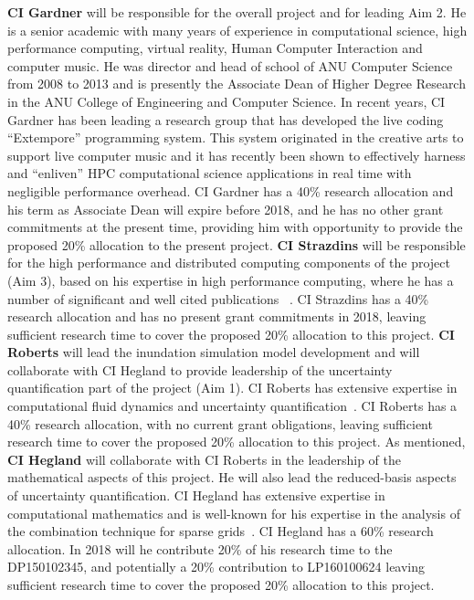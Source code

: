 {\bf CI Gardner} will be responsible for the overall project and for leading Aim 2. He is a senior
academic with many years of experience in computational science, high
performance computing, virtual reality, Human Computer Interaction and
computer music. He was director and head of school of ANU Computer
Science from 2008 to 2013 and is presently the Associate Dean of
Higher Degree Research in the ANU College of Engineering and Computer
Science. In recent years, CI Gardner has been leading a research group
that has developed the live coding ``Extempore'' programming
system. This system originated in the creative arts to support live
computer music and it has recently been shown to effectively harness and
``enliven'' HPC computational science applications in
real time with negligible performance overhead. CI Gardner has a 40\%
research allocation and his term as Associate Dean will expire before 2018, and
he has no other grant commitments at the present time, 
providing him with opportunity to provide the proposed 20\% allocation
to the present project. 
%
{\bf CI Strazdins} will be responsible for the high performance and
distributed computing components of the project (Aim 3), based on his
expertise in high performance computing, where he has a number of
significant and well cited publications
~\parencite{AliEtal2015,sgctalg15,Ali11022016}.  CI Strazdins
has a 40\% research allocation and has no present grant commitments in 2018, leaving sufficient research time to
cover the proposed 20\% allocation to this project.
%
{\bf CI Roberts} will lead the inundation simulation model development and will 
collaborate with CI Hegland to provide leadership of the 
uncertainty quantification part of the project (Aim 1). CI Roberts has extensive 
expertise in computational
fluid dynamics and uncertainty
quantification~\parencite{deBaarRDM2015,JakemanRoberts2013,anugamanual,nielsen2005hydrodynamic}.
CI Roberts has a 40\% research allocation, with no current grant
obligations, leaving sufficient research time to cover the proposed
20\% allocation to this project.
%
As mentioned, {\bf CI Hegland} will collaborate with CI Roberts in the leadership of the mathematical aspects of
this project. He will also lead the reduced-basis aspects of uncertainty quantification. CI Hegland has extensive expertise in
computational mathematics and is well-known for his expertise in the analysis
of the combination technique for sparse
grids~\parencite{AliEtal2015,HardingHLS2015,Ali11022016}.  CI Hegland
has a 60\% research allocation. In 2018 will he contribute 20\% of his
research time to the DP150102345, and potentially a 20\% contribution
to LP160100624 leaving sufficient research time to cover the proposed
20\% allocation to this project.


